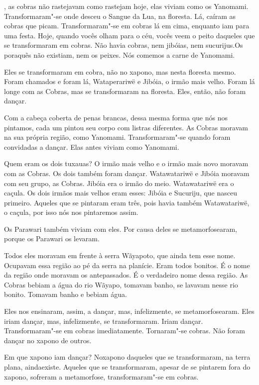  

, as cobras não rastejavam como rastejam hoje, elas
viviam como os Yanomami. Transformaram"-se onde desceu o Sangue da Lua,
na floresta. Lá, caíram as cobras que picam. Transformaram"-se em cobras
lá em cima, enquanto iam para uma festa. Hoje, quando vocês olham para o
céu, vocês veem o peito daqueles que se transformaram em cobras. Não
havia cobras, nem jibóias, nem sucurijus.Os poraquês não existiam, nem
os peixes. Nós comemos a carne de Yanomami.

Eles se transformaram em cobra, não no xapono, mas nesta floresta mesmo.
Foram chamados e foram lá, Wataperariwë e Jibóia, o irmão mais velho.
Foram lá longe com as Cobras, mas se transformaram na floresta. Eles,
então, não foram dançar. 

Com a cabeça coberta de penas brancas, dessa mesma forma que nós nos
pintamos, cada um pintou seu corpo com listras diferentes. As Cobras
moravam na sua própria região, como Yanomami. Transformaram"-se quando
foram convidadas a dançar. Elas antes viviam como Yanomami. 

Quem eram os dois tuxauas? O irmão mais velho e o irmão mais novo
moravam com as Cobras. Os dois também foram dançar. Watawatariwë e
Jibóia moravam com seu grupo, as Cobras. Jibóia era o irmão do meio.
Watawatariwë era o caçula. Os dois irmãos mais velhos eram esses: Jibóia
e Sucuriju, que nasceu primeiro. Aqueles que se pintaram eram três, pois
havia também Watawatariwë, o caçula, por isso nós nos pintaremos assim. 

Os Parawari também viviam com eles. Por causa deles se metamorfosearam,
porque os Parawari os levaram. 

Todos eles moravam em frente à serra Wãyapoto, que ainda tem esse nome.
Ocupavam essa região ao pé da serra na planície. Eram todos bonitos. É o
nome da região onde moravam os antepassados. É o verdadeiro nome dessa
região. As Cobras bebiam a água do rio Wãyapo, tomavam banho, se lavavam
nesse rio bonito. Tomavam banho e bebiam água. 

Eles nos ensinaram, assim, a dançar, mas, infelizmente, se
metamorfosearam. Eles iriam dançar, mas, infelizmente, se transformaram.
Iriam dançar. Transformaram"-se em cobras imediatamente. Tornaram"-se
cobras. Não foram dançar no xapono de outros. 

Em que xapono iam dançar? Noxapono daqueles que se transformaram, na
terra plana, aindaexiste. Aqueles que se transformaram, apesar de se
pintarem fora do xapono, sofreram a metamorfose, transformaram"-se em
cobras. 

